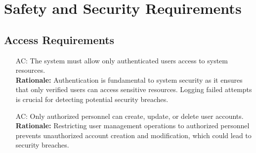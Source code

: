 \documentclass{article}
\newcounter{acnum} %
\begin{document}
\section{Safety and Security Requirements}

\subsection{Access Requirements}
\begin{itemize}
    \item [AC\refstepcounter{acnum}\theacnum \label{AC_Authentication}:] The system must allow only authenticated users access to system resources.\\
    \textbf{Rationale:} Authentication is fundamental to system security as it ensures that only verified users can access sensitive resources. Logging failed attempts is crucial for detecting potential security breaches.
    \item [AC\refstepcounter{acnum}\theacnum \label{AC_AuthorizedPersonnel}:] Only authorized personnel can create, update, or delete user accounts.\\
    \textbf{Rationale:} Restricting user management operations to authorized personnel prevents unauthorized account creation and modification, which could lead to security breaches.
\end{itemize}
\end{document}
